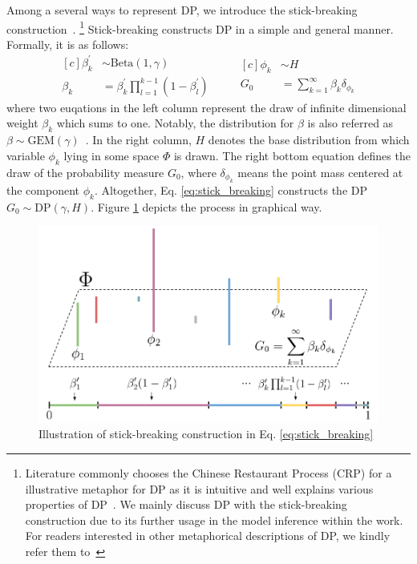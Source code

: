 \documentclass{article}
\begin{document}
Among a several ways to represent DP, we introduce the stick-breaking construction~\cite{sethuraman94}.
\footnote{Literature commonly chooses the Chinese Restaurant Process (CRP) for a illustrative metaphor for DP as it is intuitive and well explains various properties of DP~\cite{DBLP:reference/ml/Teh17}. We mainly discuss DP with the stick-breaking construction due to its further usage in the model inference within the work. For readers interested in other metaphorical descriptions of DP, we kindly refer them to~\cite{DBLP:reference/ml/Teh17, DBLP:conf/ismir/HoffmanBC08}}
Stick-breaking constructs DP in a simple and general manner. Formally, it is as follows:
\begin{equation}\label{eq:stick_breaking}
\begin{aligned}[c]
    \beta^{\prime}_{k} &\sim \text{Beta}(1, \gamma) \\
    \beta_{k} &= \beta^{\prime}_{k} \prod_{l=1}^{k-1} (1 - \beta_{l}^{\prime})
\end{aligned}
\qquad
\begin{aligned}[c]
    \phi_{k} &\sim H \\
    G_{0} &= \sum^{\infty}_{k=1} \beta_{k}\delta_{\phi_{k}}
\end{aligned}
\end{equation}
where two euqations in the left column represent the draw of infinite dimensional weight $\beta_{k}$ which sums to one. Notably, the distribution for $\beta$ is also referred as $\beta \sim \text{GEM}(\gamma)$~\cite{DBLP:journals/cpc/Pitman02}. In the right column, $H$ denotes the base distribution from which variable $\phi_{k}$ lying in some space $\Phi$ is drawn. The right bottom equation defines the draw of the probability measure $G_{0}$, where $\delta_{\phi_{k}}$ means the point mass centered at the component $\phi_{k}$. Altogether, Eq. \ref{eq:stick_breaking} constructs the DP $G_{0} \sim \text{DP}(\gamma, H)$. Figure \ref{fig:stick_breaking} depicts the process in graphical way.
\begin{figure}[ht]
    \centering
    \includegraphics[width=0.9\linewidth]{figs/stick-breaking.pdf}
    \caption{Illustration of stick-breaking construction in Eq. \ref{eq:stick_breaking}}
    \label{fig:stick_breaking}
\end{figure}
\end{document}
